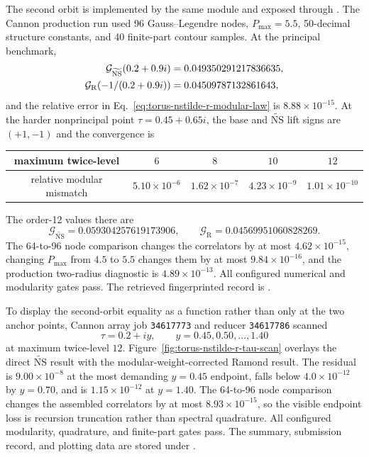 \documentclass[11pt]{article}
\newcommand{\NS}{\mathrm{NS}}
\newcommand{\R}{\mathrm{R}}
\begin{document}
The second orbit is implemented by the same module and exposed through
.  The Cannon production
run used 96 Gauss--Legendre nodes, $P_{\max}=5.5$, 50-decimal structure
constants, and 40 finite-part contour samples.  At the principal benchmark,
\begin{align}
 \mathcal G_{\widetilde{\NS}}(0.2+0.9i)
 &=0.049350291217836635,\notag\\
 \mathcal G_{\R}(-1/(0.2+0.9i))
 &=0.04509787132861643,
 \label{eq:torus-nstilde-r-anchor}
\end{align}
and the relative error in
Eq.~\eqref{eq:torus-nstilde-r-modular-law} is
$8.88\times10^{-15}$.  At the harder nonprincipal point
$\tau=0.45+0.65i$, the base and
$\widetilde{\NS}$ lift signs are $(+1,-1)$ and the convergence is
\begin{center}
\begin{tabular}{c|cccc}
maximum twice-level & $6$ & $8$ & $10$ & $12$\\
\hline
relative modular mismatch
&$5.10\times10^{-6}$&$1.62\times10^{-7}$
&$4.23\times10^{-9}$&$1.01\times10^{-10}$
\end{tabular}
\end{center}
The order-12 values there are
\[
 \mathcal G_{\widetilde{\NS}}=0.059304257619173906,
 \qquad
 \mathcal G_{\R}=0.04569951060828269.
\]
The 64-to-96 node comparison changes the correlators by at most
$4.62\times10^{-15}$, changing $P_{\max}$ from $4.5$ to $5.5$ changes them
by at most $9.84\times10^{-16}$, and the production two-radius diagnostic is
$4.89\times10^{-13}$.  All configured numerical and modularity gates pass.
The retrieved fingerprinted record is
.

To display the second-orbit equality as a function rather than only at the
two anchor points, Cannon array job \texttt{34617773} and reducer
\texttt{34617786} scanned
\[
 \tau=0.2+iy,\qquad y=0.45,0.50,\ldots,1.40
\]
at maximum twice-level $12$.  Figure~\ref{fig:torus-nstilde-r-tau-scan}
overlays the direct $\widetilde{\NS}$ result with the modular-weight-corrected
Ramond result.  The residual is $9.00\times10^{-8}$ at the most demanding
$y=0.45$ endpoint, falls below $4.0\times10^{-12}$ by $y=0.70$, and is
$1.15\times10^{-12}$ at $y=1.40$.  The 64-to-96 node comparison changes the
assembled correlators by at most $8.93\times10^{-15}$, so the visible
endpoint loss is recursion truncation rather than spectral quadrature.
All configured modularity, quadrature, and finite-part gates pass.  The
summary, submission record, and plotting data are stored under
.
\end{document}
